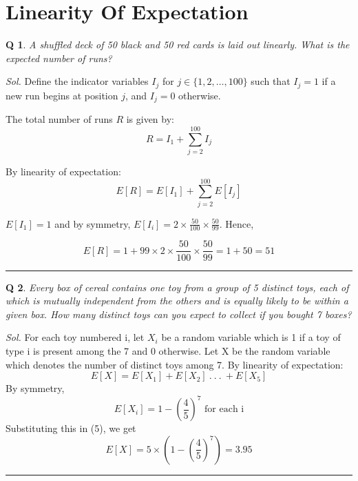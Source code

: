 \documentclass[DIV=15, fleqn, oneside, 8pt]{scrartcl}
\theoremstyle{clean}
\newtheorem{question}{Q} %
\newenvironment{solution}
{\par\textit{Sol.} }     %
{\par\medskip\hrule\bigskip}
\begin{document}
\newpage
\section*{Linearity Of Expectation}
\begin{question}
A shuffled deck of 50 black and 50 red cards is laid out linearly. What is the expected number of
runs?
\end{question}
\begin{solution}
Define the indicator variables $I_j$ for $j \in \{1, 2, \dots, 100\}$ such that $I_j = 1$ if a new 
run begins at position $j$, and $I_j = 0$ otherwise.

The total number of runs $R$ is given by:
\[ R = I_1 + \sum_{j=2}^{100} I_j \]

By linearity of expectation:
\[ E[R] = E[I_1] + \sum_{j=2}^{100} E[I_j] \]

$E[I_1] = 1$ and by symmetry, $E[I_i] = 2 \times \frac{50}{100} \times \frac{50}{99}$. Hence,

\[
E[R] = 1 + 99 \times 2 \times \frac{50}{100} \times \frac{50}{99} = 1 + 50 = 51
\]
\end{solution}
\begin{question}
Every box of cereal contains one toy from a group of 5 distinct toys, 
each of which is mutually independent from the others and is equally likely to be within a given box. 
How many distinct toys can you expect to collect if you bought 7 boxes?
\end{question}
\begin{solution}
For each toy numbered i, let $X_i$ be a random variable which is 1 if a toy of type i is present
among the 7 and 0 otherwise. Let X be the random variable which denotes the number of distinct
toys among 7. By linearity of expectation:
\begin{equation}
E[X] = E[X_1] + E[X_2]\:.\:.\:.\:+E[X_5]
\end{equation}
By symmetry,
\[E[X_i] = 1 - (\frac{4}{5})^7 \text{ for each i}\]
Substituting this in (5), we get
\[E[X] = 5 \times (1 - (\frac{4}{5})^7) = 3.95\]
\end{solution}

\newpage
\end{document}
